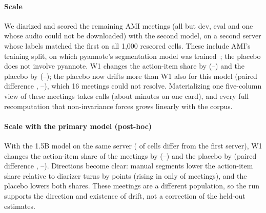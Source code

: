 \documentclass[conference]{IEEEtran}
\begin{document}
\paragraph*{Scale} We diarized and scored the \nScaleN{} remaining AMI meetings (all but dev, eval and one whose audio
could not be downloaded) with the second model, on a second server whose labels matched the first on all 1,000
rescored cells. These include AMI's training split, on which pyannote's segmentation model was trained~\cite{segcard};
the placebo does not involve pyannote. W1 changes the action-item share by \nScaleWoneQonemed{}
(\nScaleWoneQonelo--\nScaleWoneQonehi) and the placebo by \nScaleWtwoQonemed{} (\nScaleWtwoQonelo--\nScaleWtwoQonehi);
the placebo now drifts more than W1 also for this model (paired difference \nScaleGapmed, \nScaleGaplo--\nScaleGaphi),
which 16 meetings could not resolve. Materializing one five-column view of these meetings takes \nScaleCallsManual{}
calls (about \nScaleMinManual{} minutes on one card), and every full recomputation that non-invariance forces grows
linearly with the corpus.
\paragraph*{Scale with the primary model (post-hoc)} With the 1.5B model on the same server (\nXhostPmism{} of
\nXhostPN{} cells differ from the first server), W1 changes the action-item share of the \nScalePN{} meetings by
\nScalePWoneQonemed{} (\nScalePWoneQonelo--\nScalePWoneQonehi) and the placebo by \nScalePWtwoQonemed{} (paired
difference \nScalePGapmed, \nScalePGaplo--\nScalePGaphi). Directions become clear: manual segments lower the
action-item share relative to diarizer turns by \nScalePWoneQoneabs{} points (rising in only \nScalePWoneQoneup{} of
\nScalePN{} meetings), and the placebo lowers both shares. These meetings are a different population, so the run
supports the direction and existence of drift, not a correction of the held-out estimates.
\end{document}
